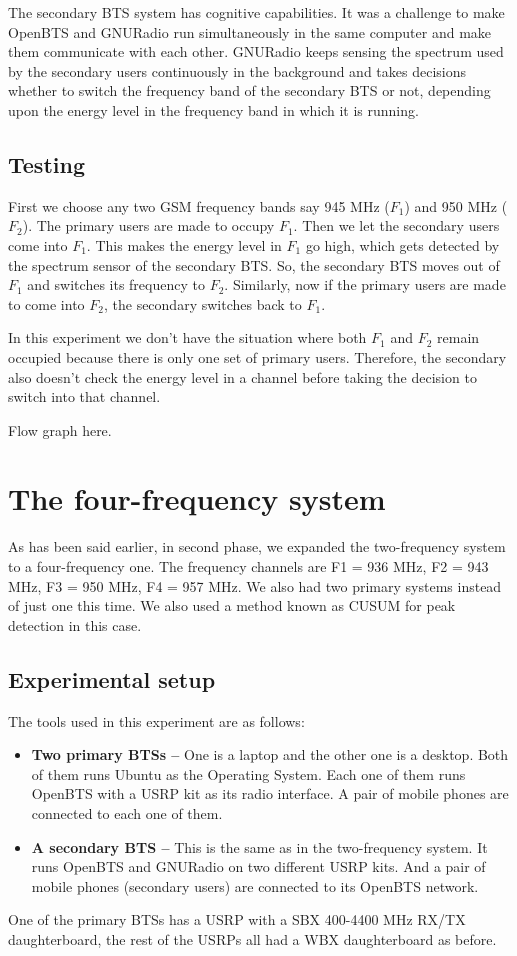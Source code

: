 The secondary BTS system has cognitive capabilities. It was a challenge to 
make OpenBTS and GNURadio run simultaneously in the same computer and make 
them communicate with each other. GNURadio keeps sensing the spectrum used by
the secondary users continuously in the background and takes decisions whether
to switch the frequency band of the secondary BTS or not, depending upon the 
energy level in the frequency band in which it is running.

\subsection{Testing}
First we choose any two GSM frequency bands say 945 MHz ($F_1$) and 950 MHz 
($F_2$). The primary users are made to occupy $F_1$. Then we let the secondary
users come into $F_1$. This makes the energy level in $F_1$ go high, which gets
detected by the spectrum sensor of the secondary BTS. So, the secondary BTS 
moves out of $F_1$ and switches its frequency to $F_2$. Similarly, now if the
primary users are made to come into $F_2$, the secondary switches back to $F_1$.

In this experiment we don't have the situation where both $F_1$ and $F_2$ remain 
occupied because there is only one set of primary users. Therefore, the 
secondary also doesn't check the energy level in a channel before taking the
decision to switch into that channel.

Flow graph here.


\section{The four-frequency system}

As has been said earlier, in second phase, we expanded the two-frequency
system to a four-frequency one. The frequency channels are F1 = 936 MHz, F2 =
943 MHz, F3 = 950 MHz, F4 = 957 MHz.
We also had two primary systems instead of just one this time.
We also used a method known as CUSUM for peak
detection in this case.
\subsection{Experimental setup}
The tools used in this experiment are as follows:
\begin{itemize}
    \item \textbf{Two primary BTSs --} One is a laptop and the other one is a
    desktop. Both of them runs Ubuntu as the Operating System. Each one of
    them runs OpenBTS with a USRP kit as its radio interface. A pair of mobile
    phones are connected to each one of them.
    \item \textbf{A secondary BTS --} This is the same as in the 
    two-frequency system. It runs OpenBTS and GNURadio on two different USRP
    kits. And a pair of mobile phones (secondary users) are connected to its
    OpenBTS network.
\end{itemize}

One of the primary BTSs has a USRP with a SBX 400-4400 MHz RX/TX 
daughterboard, the rest of the USRPs all had a WBX daughterboard as before.


